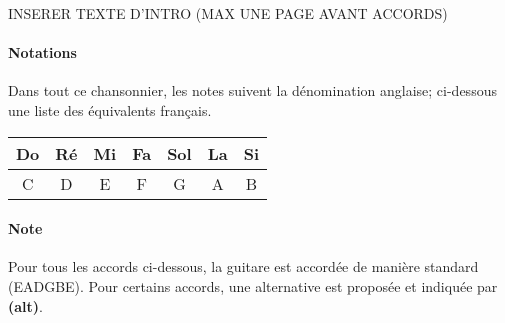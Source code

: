 
INSERER TEXTE D'INTRO (MAX UNE PAGE AVANT ACCORDS)
\paragraph{Notations} Dans tout ce chansonnier, les notes suivent la dénomination anglaise; ci-dessous une liste des équivalents français.
\newline\newline
\begin{tabular}{||c||c||c||c||c||c||c||}
    \hline
    Do & Ré & Mi & Fa & Sol & La & Si\\
    \hline
    C & D & E & F & G & A & B\\
    \hline
\end{tabular}
\paragraph{Note} Pour tous les accords ci-dessous, la guitare est accordée de manière standard (EADGBE).\newline
Pour certains accords, une alternative est proposée et indiquée par \textbf{(alt)}.

\newpage
\usebox{\A}
\usebox{\Aalt}
\usebox{\Am}
\usebox{\Amalt}
\usebox{\Afive}
\usebox{\Aseven}
\usebox{\Asevenalt}
\usebox{\Amajseven}
\usebox{\Amajsevenalt}
\usebox{\Amseven}
\usebox{\Amsevenalt}
\usebox{\Asusfour}
\usebox{\Asusfouralt}
\usebox{\Aaddnine}
\usebox{\Asustwo}
\usebox{\Asevensusfour}
\usebox{\Asevensusfouralt}
\usebox{\Asevensharpnine}
\usebox{\Anine}

\newpage
\usebox{\B}
\usebox{\Bm}
\usebox{\Bfive}
\usebox{\Bseven}
\usebox{\Bsevenalt}
\usebox{\Bmajseven}
\usebox{\Bmseven}
\usebox{\Bsusfour}
\usebox{\Baddnine}
\usebox{\Bsustwo}
\usebox{\Bsevensusfour}
\usebox{\Bsevensharpnine}
\usebox{\Bnine}

\newpage
\usebox{\C}
\usebox{\Calt}
\usebox{\Cm}
\usebox{\Cfive}
\usebox{\Cseven}
\usebox{\Csevenalt}
\usebox{\Cmajseven}
\usebox{\Cmajsevenalt}
\usebox{\Cmseven}
\usebox{\Csusfour}
\usebox{\Caddnine}
\usebox{\Caddninealt}
\usebox{\Csustwo}
\usebox{\Csevensusfour}
\usebox{\Csevensharpnine}
\usebox{\Cnine}

\newpage
\usebox{\D}
\usebox{\Dalt}
\usebox{\Dm}
\usebox{\Dmalt}
\usebox{\Dfive}
\usebox{\Dseven}
\usebox{\Dsevenalt}
\usebox{\Dmajseven}
\usebox{\Dmajsevenalt}
\usebox{\Dmseven}
\usebox{\Dmsevenalt}
\usebox{\Dsusfour}
\usebox{\Dsusfouralt}
\usebox{\Daddnine}
\usebox{\Dsustwo}
\usebox{\Dsustwoalt}
\usebox{\Dsevensusfour}
\usebox{\Dsevensusfouralt}
\usebox{\Dsevensharpnine}
\usebox{\Dnine}

